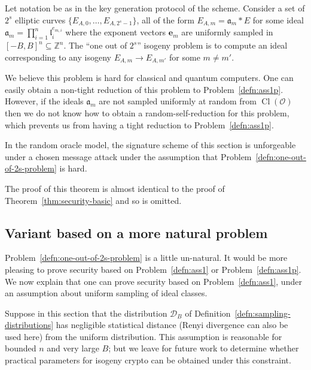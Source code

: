 \documentclass{llncs}
\newcommand{\D}{\mathcal{D}}
\newcommand{\OO}{\mathcal{O}}
\newcommand{\Z}{\mathbb{Z}}
\DeclareMathOperator{\Cl}{Cl}
\renewcommand{\a}{\mathfrak{a}}
\renewcommand{\l}{\mathfrak{l}}
\newcommand{\e}{\mathbf{e}}
\begin{document}
\begin{problem}\label{defn:one-out-of-2s-problem}
Let notation be as in the key generation protocol of the scheme.
Consider a set of $2^s$ elliptic curves $\{ E_{A,0}, \dots, E_{A,2^s-1} \}$, all of the form $E_{A,m} = \a_m * E$ for some ideal $\a_m = \prod_{i=1}^n \l_i^{e_{m,i}}$ where the exponent vectors $\e_m $ are uniformly sampled in $[-B,B]^n \subseteq \Z^n$. The ``one out of $2^s$'' isogeny problem is to compute an ideal corresponding to any isogeny $E_{A,m} \to E_{A,m'}$ for some $m \ne m'$.
\end{problem}



We believe this problem is hard for classical and quantum computers. One can easily obtain a non-tight reduction of this problem to Problem~\ref{defn:ass1p}.
However, if the ideals $\a_m$ are not sampled uniformly at random from $\Cl(\OO)$ then we do not know how to obtain a random-self-reduction for this problem, which prevents us from having a tight reduction to Problem~\ref{defn:ass1p}.


\begin{theorem}\label{thm2}
In the random oracle model, the signature scheme of this section is unforgeable under a chosen message attack under the assumption that Problem~\ref{defn:one-out-of-2s-problem} is hard.
\end{theorem}

The proof of this theorem is almost identical to the proof of Theorem~\ref{thm:security-basic} and so is omitted.



\subsection{Variant based on a more natural problem} \label{sec:natural-problem}


Problem~\ref{defn:one-out-of-2s-problem} is a little un-natural.
It would be more pleasing to prove security based on Problem~\ref{defn:ass1} or Problem~\ref{defn:ass1p}.
We now explain that one can prove security based on Problem~\ref{defn:ass1}, under an assumption about uniform sampling of ideal classes.

Suppose in this section that the distribution $\D_B$ of Definition~\ref{defn:sampling-distributions} has negligible statistical distance (Renyi divergence can also be used here) from the uniform distribution.
This assumption is reasonable for bounded $n$ and very large $B$; but we leave for future work to determine whether practical parameters for isogeny crypto can be obtained under this constraint.
\end{document}
